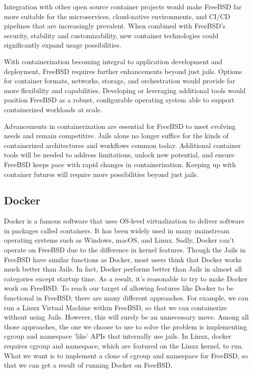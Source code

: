\documentclass[12pt, dvipsnames, a4paper]{article}
\begin{document}
Integration with other open source container projects would make FreeBSD far more suitable for the microservices, cloud-native environments, and CI/CD pipelines that are increasingly prevalent. When combined with FreeBSD's security, stability and customizability, new container technologies could significantly expand usage possibilities.

With containerization becoming integral to application development and deployment, FreeBSD requires further enhancements beyond just jails. Options for container formats, networks, storage, and orchestration would provide far more flexibility and capabilities. Developing or leveraging additional tools would position FreeBSD as a robust, configurable operating system able to support containerized workloads at scale.

Advancements in containerization are essential for FreeBSD to meet evolving needs and remain competitive. Jails alone no longer suffice for the kinds of containerized architectures and workflows common today. Additional container tools will be needed to address limitations, unlock new potential, and ensure FreeBSD keeps pace with rapid changes in containerization. Keeping up with container futures will require more possibilities beyond just jails.

\subsection{Docker}
Docker is a famous software that uses OS-level virtualization to deliver software in packages called containers. It has been widely used in many mainstream operating systems such as Windows, macOS, and Linux. Sadly, Docker can't operate on FreeBSD due to the difference in kernel features. Though the Jails in FreeBSD have similar functions as Docker, most users think that Docker works much better than Jails. In fact, Docker performs better than Jails in almost all categories except startup time. As a result, it's reasonable to try to make Docker work on FreeBSD.
To reach our target of allowing features like Docker to be functional in FreeBSD, there are many different approaches. For example, we can run a Linux Virtual Machine within FreeBSD, so that we can containerize without using Jails. However, this will surely be an unnecessary move. Among all those approaches, the one we choose to use to solve the problem is implementing cgroup and namespace 'like' APIs that internally use jails. In Linux, docker requires cgroup and namespace, which are featured on the Linux kernel, to run. What we want is to implement a clone of cgroup and namespace for FreeBSD, so that we can get a result of running Docker on FreeBSD.
\end{document}

